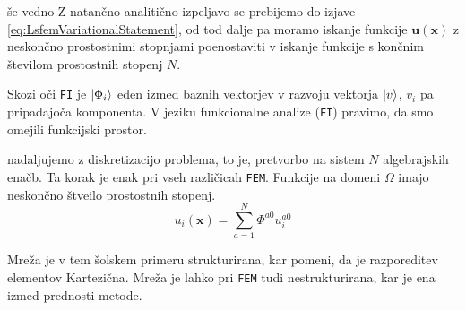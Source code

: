 še vedno  Z natančno analitično izpeljavo se prebijemo do izjave \eqref{eq:LsfemVariationalStatement}, od tod dalje pa moramo iskanje funkcije $\mathbf{u(x)}$ z neskončno prostostnimi stopnjami poenostaviti v iskanje funkcije s končnim številom prostostnih stopenj $N$.

Skozi oči \texttt{FI} je $\ket{\Phi_i}$ eden izmed baznih vektorjev v razvoju vektorja $\ket{v}$, $v_i$ pa pripadajoča komponenta.
V jeziku funkcionalne analize (\texttt{FI}) pravimo, da smo omejili funkcijski prostor.

nadaljujemo z diskretizacijo problema, to je, pretvorbo na sistem $N$ algebrajskih enačb. Ta korak je enak pri vseh različicah \texttt{FEM}. Funkcije na domeni $\Omega$ imajo neskončno štveilo prostostnih stopenj.
\begin{equation}
   u_i(\mathbf{x}) = \sum_{a = 1}^N \Phi^{a0} u^{a0}_i
\end{equation}

Mreža je v tem šolskem primeru strukturirana, kar pomeni, da je razporeditev elementov Kartezična. Mreža je lahko pri \texttt{FEM} tudi nestrukturirana, kar je ena izmed prednosti metode.

